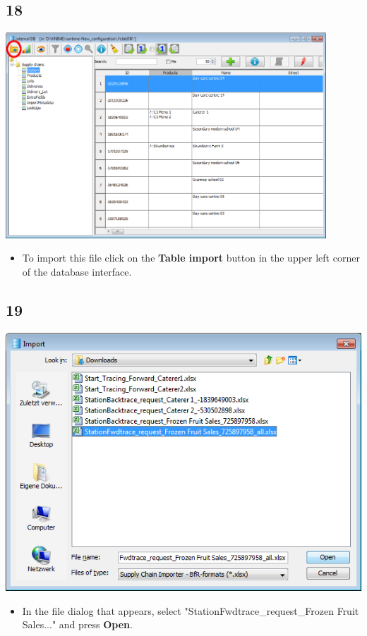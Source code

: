 \documentclass{beamer}
\begin{document}
\subsection{18}
\begin{frame}
	\begin{center}
  		\includegraphics[width=0.9\textwidth]{18.png}
	\end{center}
	\begin{itemize}
		\item To import this file click on the \textbf{Table import} button in the upper left corner of the database interface.
	\end{itemize}
\end{frame}

\subsection{19}
\begin{frame}
	\begin{center}
  		\includegraphics[height=0.5\textheight]{19.png}
	\end{center}
	\begin{itemize}
		\item In the file dialog that appears, select "StationFwdtrace\_request\_Frozen Fruit Sales..." and press \textbf{Open}.	
	\end{itemize}
\end{frame}
\end{document}
